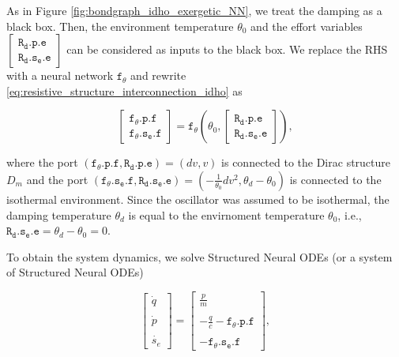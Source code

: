 \documentclass[
	parskip, 			   %
	twoside, 			   %
	DIV=14, 			   %
	BCOR=15.0mm, 		   %
	headsepline, 		   %
	open=right, 		   %
	captions=tableheading, %
	bibliography=totoc,    %
	numbers=noenddot       %
]{scrreprt}
\begin{document}
As in Figure \ref{fig:bondgraph_idho_exergetic_NN}, we treat the damping as a black box. Then, the environment temperature $\theta_0$ and the effort variables $\left[\begin{array}{l}\mathtt{R_{d}.p.e} \\ \mathtt{R_{d}.s_{e}.e}\end{array}\right]$ can be considered as inputs to the black box. We replace the RHS with a neural network $\mathtt{f_{\theta}}$ and rewrite \ref{eq:resistive_structure_interconnection_idho} as

\begin{equation}
    \label{eq:resistive_structure_interconnection_NN_idho}
    \left[\begin{array}{l}\mathtt{f_{\theta}.p.f} \\ \mathtt{f_{\theta}.s_{e}.f}\end{array}\right]= \mathtt{f_{\theta}} \left(\theta_0, 
    \left[\begin{array}{l}\mathtt{R_{d}.p.e} \\ \mathtt{R_{d}.s_{e}.e}\end{array}\right] \right),
\end{equation}

where the port $(\mathtt{f_{\theta}.p.f}, \mathtt{R_{d}.p.e}) = (dv, v)$ is connected to the Dirac structure $D_m$ and the port $(\mathtt{f_{\theta}.s_{e}.f}, \mathtt{R_{d}.s_{e}.e}) = (-\frac{1}{\theta_{0}}dv^2, \theta_{d}-\theta_{0})$ is connected to the isothermal environment. Since the oscillator was assumed to be isothermal, the damping temperature $\theta_{d}$ is equal to the envirnoment temperature $\theta_{0}$, i.e., $\mathtt{R_{d}.s_{e}.e} = \theta_{d}-\theta_{0} = 0$.

To obtain the system dynamics, we solve Structured Neural ODEs (or a system of Structured Neural ODEs)

\begin{equation}
    \label{eq:NeuralODE_idho_EPHS}
    \begin{bmatrix}
    \dot{q}\\\\
    \dot{p}\\\\
    \dot{s_e}
    \end{bmatrix}
    =
    \begin{bmatrix}
    \frac{p}{m}\\\\
    -\frac{q}{c}-\mathtt{f_{\theta}.p.f}\\\\
    -\mathtt{f_{\theta}.s_{e}.f}
    \end{bmatrix},
\end{equation}
\end{document}
